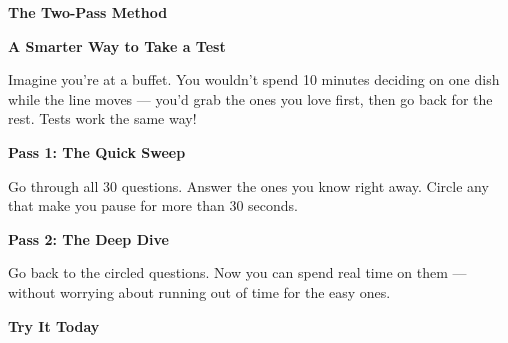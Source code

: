 \clearpage
\thispagestyle{empty}
{\sffamily

\begin{center}
{\fontsize{22}{26}\selectfont\bfseries\color{funGreen} \faSync\hspace{3mm}The Two-Pass Method\hspace{3mm}\faSync}

\vspace{2mm}
{\color{funGray}\hrulefill}
\end{center}

\vspace{3mm}

\begin{tcolorbox}[
    enhanced,
    colback=funGreenLight,
    colframe=funGreen!50,
    arc=10pt,
    boxrule=1.5pt,
    left=6mm, right=6mm, top=5mm, bottom=5mm,
]
{\large\bfseries\color{funGreenDark} \faRoute\hspace{2mm}A Smarter Way to Take a Test}

\vspace{2mm}

Imagine you're at a buffet. You wouldn't spend 10 minutes deciding on one dish while the line moves — you'd grab the ones you love first, then go back for the rest. Tests work the same way!

\vspace{4mm}

\textbf{\textcolor{funGreen}{\faForward}\hspace{2mm}Pass 1: The Quick Sweep}

Go through all 30 questions. Answer the ones you know right away. Circle any that make you pause for more than 30 seconds.

\vspace{3mm}

\textbf{\textcolor{funGreen}{\faRedo}\hspace{2mm}Pass 2: The Deep Dive}

Go back to the circled questions. Now you can spend real time on them — without worrying about running out of time for the easy ones.
\end{tcolorbox}

\vspace{3mm}

\begin{tcolorbox}[
    enhanced,
    colback=funYellowLight,
    colframe=funYellow!60,
    arc=10pt,
    boxrule=1pt,
    left=6mm, right=6mm, top=4mm, bottom=4mm,
]
{\bfseries\color{funYellowDark} \faLightbulb\hspace{2mm}Try It Today}


\end{tcolorbox}}
